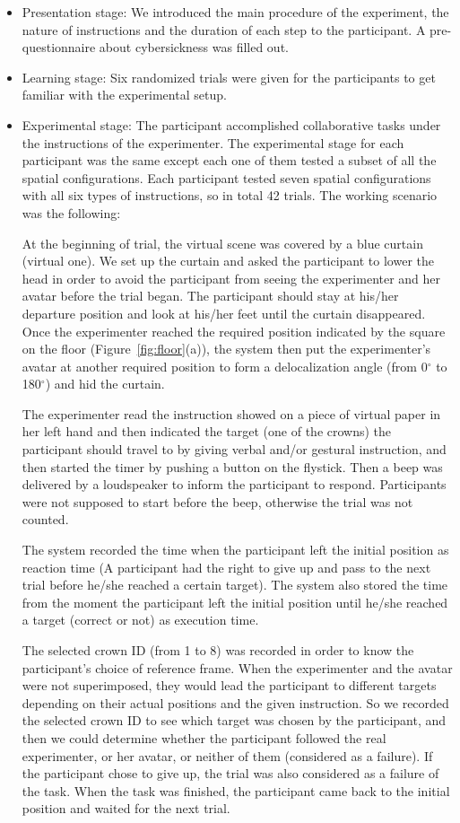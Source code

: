 \begin{itemize}
\item Presentation stage: We introduced the main procedure of the experiment, the nature of instructions and the duration of each step to the participant. A pre-questionnaire about cybersickness was filled out.
\item Learning stage: Six randomized trials were given for the participants to get familiar with the experimental setup.
\item Experimental stage: The participant accomplished collaborative tasks under the instructions of the experimenter. The experimental stage for each participant was the same except each one of them tested a subset of all the spatial configurations. Each participant tested seven spatial configurations with all six types of instructions, so in total 42 trials. The working scenario was the following:

At the beginning of trial, the virtual scene was covered by a blue curtain (virtual one). We set up the curtain and asked the participant to lower the head in order to avoid the participant from seeing the experimenter and her avatar before the trial began. The participant should stay at his/her departure position and look at his/her feet until the curtain disappeared. Once the experimenter reached the required position indicated by the square on the floor (Figure~\ref{fig:floor}(a)), the system then put the experimenter's avatar at another required position to form a delocalization angle (from 0$^\circ$ to 180$^\circ$) and hid the curtain.

The experimenter read the instruction showed on a piece of virtual paper in her left hand and then indicated the target (one of the crowns) the participant should travel to by giving verbal and/or gestural instruction, and then started the timer by pushing a button on the flystick. Then a beep was delivered by a loudspeaker to inform the participant to respond. Participants were not supposed to start before the beep, otherwise the trial was not counted.

The system recorded the time when the participant left the initial position as reaction time (A participant had the right to give up and pass to the next trial before he/she reached a certain target). The system also stored the time from the moment the participant left the initial position until he/she reached a target (correct or not) as execution time.

The selected crown ID (from 1 to 8) was recorded in order to know the participant's choice of reference frame. When the experimenter and the avatar were not superimposed, they would lead the participant to different targets depending on their actual positions and the given instruction. So we recorded the selected crown ID to see which target was chosen by the participant, and then we could determine whether the participant followed the real experimenter, or her avatar, or neither of them (considered as a failure). If the participant chose to give up, the trial was also considered as a failure of the task. When the task was finished, the participant came back to the initial position and waited for the next trial.


\end{itemize}
